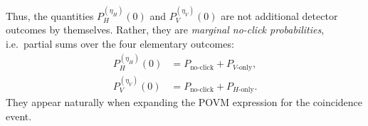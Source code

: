 \documentclass[%
 reprint,
 amsmath,amssymb,
 aps,
twocolumn
]{revtex4-2}
\begin{document}
Thus, the quantities $P_H^{(\eta_H)}(0)$ and $P_V^{(\eta_V)}(0)$ are not additional detector outcomes by themselves. Rather, they are \emph{marginal no-click probabilities}, i.e.\ partial sums over the four elementary outcomes:
\begin{align}
P_H^{(\eta_H)}(0) &= P_{\text{no-click}} + P_{V\text{-only}},\\
P_V^{(\eta_V)}(0) &= P_{\text{no-click}} + P_{H\text{-only}}.
\end{align}
They appear naturally when expanding the POVM expression for the coincidence event.


\end{document}

